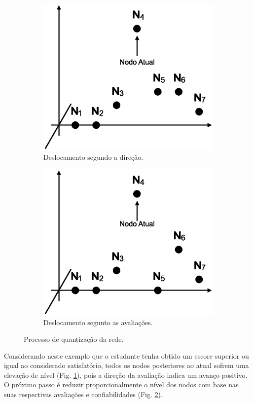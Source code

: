 \begin{figure}
\begin{subfigure}{.5\textwidth}
  		\centering
  		\includegraphics[width=.9\linewidth]{figuras/nodos3.eps}
  		\caption{Deslocamento segundo a direção.}
  		\label{fig:subnodos3}
	\end{subfigure}
	\begin{subfigure}{.5\textwidth}
  		\centering
  		\includegraphics[width=.9\linewidth]{figuras/nodos4.eps}
  		\caption{Deslocamento segunto as avaliações.}
  		\label{fig:subnodos4}
	\end{subfigure}
	\caption{Processo de quantização da rede.}
	\label{fig:nodos}
\end{figure}

Considerando neste exemplo que o estudante tenha obtido um escore superior ou igual ao considerado satisfatório, todos os nodos posteriores ao atual sofrem uma elevação de nível (Fig. \ref{fig:subnodos3}), pois a direção da avaliação indica um avanço positivo. O próximo passo é reduzir proporcionalmente o nível dos nodos com base nas suas respectivas avaliações e confiabilidades (Fig. \ref{fig:subnodos4}).

